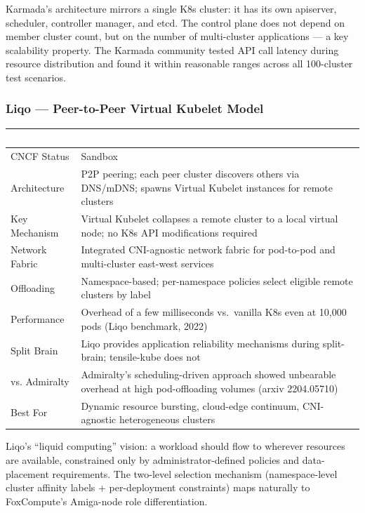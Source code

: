 \documentclass[11pt,letterpaper]{article}
\newcommand{\tableheader}[1]{\textbf{\sffamily\textcolor{white}{#1}}}
\begin{document}
Karmada's architecture mirrors a single K8s cluster: it has its own apiserver, scheduler, controller manager, and etcd. The control plane does not depend on member cluster count, but on the number of multi-cluster applications --- a key scalability property. The Karmada community tested API call latency during resource distribution and found it within reasonable ranges across all 100-cluster test scenarios.

\subsubsection{Liqo --- Peer-to-Peer Virtual Kubelet Model}

\begin{center}
\begin{tabularx}{\textwidth}{L{3cm}X}
\toprule
{}
\tableheader{Property} & \tableheader{Value} \\
\midrule
CNCF Status & Sandbox \\
Architecture & P2P peering; each peer cluster discovers others via DNS/mDNS; spawns Virtual Kubelet instances for remote clusters \\
Key Mechanism & Virtual Kubelet collapses a remote cluster to a local virtual node; no K8s API modifications required \\
Network Fabric & Integrated CNI-agnostic network fabric for pod-to-pod and multi-cluster east-west services \\
Offloading & Namespace-based; per-namespace policies select eligible remote clusters by label \\
Performance & Overhead of a few milliseconds vs.\ vanilla K8s even at 10,000 pods (Liqo benchmark, 2022) \\
Split Brain & Liqo provides application reliability mechanisms during split-brain; tensile-kube does not \\
vs. Admiralty & Admiralty's scheduling-driven approach showed unbearable overhead at high pod-offloading volumes (arxiv 2204.05710) \\
Best For & Dynamic resource bursting, cloud-edge continuum, CNI-agnostic heterogeneous clusters \\
\bottomrule
\end{tabularx}
\end{center}

Liqo's ``liquid computing'' vision: a workload should flow to wherever resources are available, constrained only by administrator-defined policies and data-placement requirements. The two-level selection mechanism (namespace-level cluster affinity labels + per-deployment constraints) maps naturally to FoxCompute's Amiga-node role differentiation.
\end{document}
